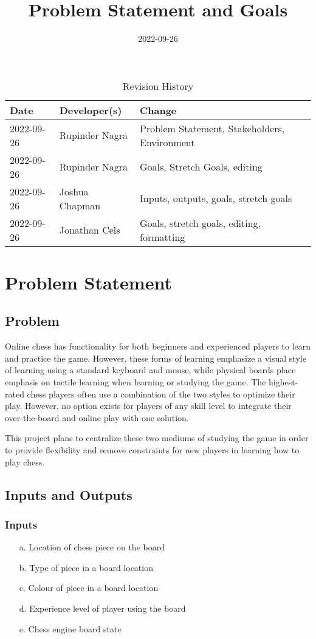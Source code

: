 \documentclass{article}
\title{Problem Statement and Goals\\\progname}
\author{\authname}
\date{2022-09-26}
\begin{document}
\maketitle

\begin{table}[hp]
\caption{Revision History} \label{TblRevisionHistory}
\begin{tabularx}{\textwidth}{llX}
\toprule
\textbf{Date} & \textbf{Developer(s)} & \textbf{Change}\\
\midrule
2022-09-26 & Rupinder Nagra & Problem Statement, Stakeholders, Environment\\
2022-09-26 & Rupinder Nagra & Goals, Stretch Goals, editing\\
2022-09-26 & Joshua Chapman & Inputs, outputs, goals, stretch goals\\
2022-09-26 & Jonathan Cels & Goals, stretch goals, editing, formatting\\
\bottomrule
\end{tabularx}
\end{table}

\section{Problem Statement}

\subsection{Problem}
{Online chess has functionality for both beginners and experienced players to learn and practice the game. 
However, these forms of learning emphasize a visual style of learning using a standard keyboard and mouse, while physical boards place emphasis on tactile learning when learning or studying the game.
The highest-rated chess players often use a combination of the two styles to optimize their play. However, no option exists for players of any skill level to integrate their over-the-board and online play with one solution.}

\medskip
{This project plans to centralize these two mediums of studying the game in order to provide flexibility and remove constraints for new players in learning how to play chess.}

\subsection{Inputs and Outputs}

\subsubsection{Inputs}
\begin{enumerate}
    \item[a.] Location of chess piece on the board
    \item[b.] Type of piece in a board location
    \item[c.] Colour of piece in a board location
    \item[d.] Experience level of player using the board
    \item[e.] Chess engine board state
\end{enumerate}
\end{document}
